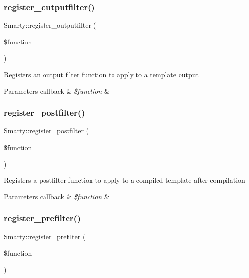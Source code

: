 \subsubsection{\texorpdfstring{register\+\_\+outputfilter()}{register\_outputfilter()}}
{\footnotesize\ttfamily Smarty\+::register\+\_\+outputfilter (\begin{DoxyParamCaption}\item[{}]{\$function }\end{DoxyParamCaption})}

Registers an output filter function to apply to a template output


\begin{DoxyParams}[1]{Parameters}
callback & {\em \$function} & \\
\hline
\end{DoxyParams}
\mbox{\label{class_smarty_a9cfd52c89ae4cbe89352edc3e6ecc0bd}} 
\subsubsection{\texorpdfstring{register\+\_\+postfilter()}{register\_postfilter()}}
{\footnotesize\ttfamily Smarty\+::register\+\_\+postfilter (\begin{DoxyParamCaption}\item[{}]{\$function }\end{DoxyParamCaption})}

Registers a postfilter function to apply to a compiled template after compilation


\begin{DoxyParams}[1]{Parameters}
callback & {\em \$function} & \\
\hline
\end{DoxyParams}
\mbox{\label{class_smarty_adeb671e9364ac6c40f58c403975d1c45}} 
\subsubsection{\texorpdfstring{register\+\_\+prefilter()}{register\_prefilter()}}
{\footnotesize\ttfamily Smarty\+::register\+\_\+prefilter (\begin{DoxyParamCaption}\item[{}]{\$function }\end{DoxyParamCaption})}

